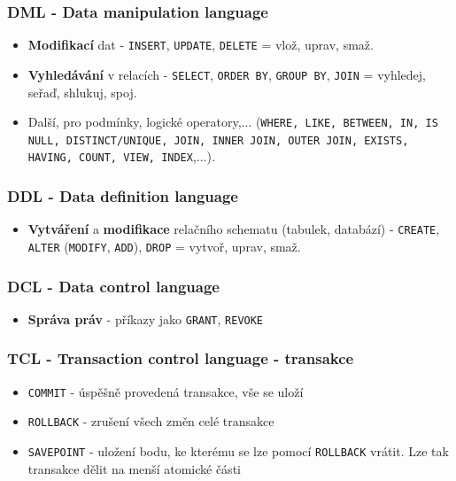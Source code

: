 \subsubsection{DML - Data manipulation language}
\begin{itemize}
	\item \textbf{Modifikací} dat -  \texttt{INSERT}, \texttt{UPDATE}, \texttt{DELETE} = vlož, uprav, smaž.
	\item \textbf{Vyhledávání} v relacích -  \texttt{SELECT}, \texttt{ORDER BY},  \texttt{GROUP BY}, \texttt{JOIN} = vyhledej, seřaď, shlukuj, spoj.	
	\item Další, pro podmínky, logické operatory,... (\texttt{WHERE, LIKE, BETWEEN, IN, IS NULL, DISTINCT/UNIQUE, JOIN, INNER JOIN, OUTER JOIN, EXISTS, HAVING, COUNT, VIEW, INDEX},...).
\end{itemize}

\subsubsection{DDL - Data definition language}
\begin{itemize}
	\item \textbf{Vytváření} a \textbf{modifikace} relačního schematu (tabulek, databází) - \texttt{CREATE}, \texttt{ALTER} (\texttt{MODIFY}, \texttt{ADD}), \texttt{DROP}  = vytvoř, uprav, smaž.
\end{itemize}

\subsubsection{DCL - Data control language}
\begin{itemize}
	\item \textbf{Správa práv} - příkazy jako \texttt{GRANT}, \texttt{REVOKE}
\end{itemize}

\subsubsection{TCL - Transaction control language - transakce}
\begin{itemize}
	\item \texttt{COMMIT} - úspěšně provedená transakce, vše se uloží
	\item \texttt{ROLLBACK} - zrušení všech změn celé transakce
	\item \texttt{SAVEPOINT} - uložení bodu, ke kterému se lze pomocí \texttt{ROLLBACK} vrátit. Lze tak transakce dělit na menší atomické části
\end{itemize}

